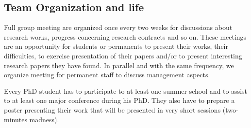 
\subsection{Team Organization and life} %
\label{sub:hadas_team_organization_and_life}%


Full group meeting are organized once every two weeks for discussions about research works, progress concerning research contracts and so on. These meetings are an opportunity for students or permanents to present their works, their difficulties, to exercise presentation of their papers and/or to present interesting research papers they have found.
In parallel and with the same frequency, we organize meeting for permanent staff to discuss management aspects.

Every PhD student has to participate to at least one summer school and to assist to at least one major conference during his PhD. They also have to prepare a poster presenting their work that will be presented in very short sessions (two-minutes madness).

